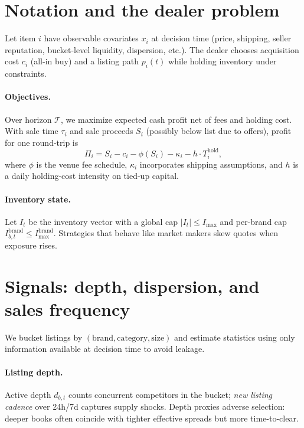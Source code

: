 \documentclass[11pt,a4paper]{article}
\begin{document}
\section{Notation and the dealer problem}
Let item $i$ have observable covariates $x_i$ at decision time (price, shipping, seller reputation,
bucket-level liquidity, dispersion, etc.). The dealer chooses acquisition cost $c_i$ (all-in buy)
and a listing path $p_i(t)$ while holding inventory under constraints.

\paragraph{Objectives.} Over horizon $\mathcal{T}$, we maximize expected cash profit net of fees
and holding cost. With sale time $\tau_i$ and sale proceeds $S_i$ (possibly below list due to
offers), profit for one round-trip is
\begin{equation}
  \Pi_i = S_i - c_i - \phi(S_i) - \kappa_i - h \cdot T^{\mathrm{hold}}_i,
  \label{eq:pnl}
\end{equation}
where $\phi$ is the venue fee schedule, $\kappa_i$ incorporates shipping assumptions,
and $h$ is a daily holding-cost intensity on tied-up capital.

\paragraph{Inventory state.} Let $I_t$ be the inventory vector with a global cap
$|I_t| \le I_{\max}$ and per-brand cap $I^{\mathrm{brand}}_{b,t} \le I^{\mathrm{brand}}_{\max}$.
Strategies that behave like market makers skew quotes when exposure rises.

\section{Signals: depth, dispersion, and sales frequency}
We bucket listings by $(\mathrm{brand}, \mathrm{category}, \mathrm{size})$ and estimate statistics
using only information available at decision time to avoid leakage.

\paragraph{Listing depth.} Active depth $d_{b,t}$ counts concurrent competitors in the bucket;
\emph{new listing cadence} over 24h/7d captures supply shocks. Depth proxies adverse selection:
deeper books often coincide with tighter effective spreads but more time-to-clear.
\end{document}
